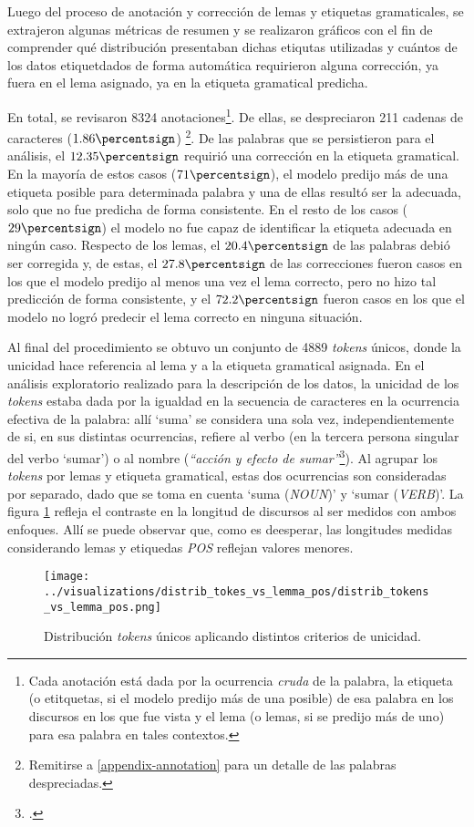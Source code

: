 Luego del proceso de anotación y corrección de lemas y etiquetas gramaticales,
se extrajeron algunas métricas de resumen y se realizaron gráficos con el fin de
comprender qué distribución presentaban dichas etiqutas utilizadas y cuántos de los
datos etiquetdados de forma automática requirieron alguna corrección, ya fuera en el
lema asignado, ya en la etiqueta gramatical predicha.
\par
En total, se revisaron 8324 anotaciones\footnote{Cada anotación está dada por
la ocurrencia \textit{cruda} de la palabra, la etiqueta (o etitquetas, si el modelo
predijo más de una posible) de esa palabra en los discursos en los que fue vista y el
lema (o lemas, si se predijo más de uno) para esa palabra en tales contextos.}.
De ellas, se despreciaron 211 cadenas de caracteres ($1.86\percentsign$)
\footnote{Remitirse a \ref{appendix-annotation} para un detalle de las palabras
despreciadas.}. De las palabras que se persistieron para el análisis,
el $12.35\percentsign$ requirió una corrección en la etiqueta gramatical.
En la mayoría de estos casos ($71\percentsign$), el modelo predijo más de una etiqueta
posible para determinada palabra y una de ellas resultó ser la adecuada, solo que no
fue predicha de forma consistente. En el resto de los casos ($29\percentsign$)
el modelo no fue capaz de identificar la etiqueta adecuada en ningún caso.
Respecto de los lemas, el $20.4\percentsign$ de las palabras debió ser corregida
y, de estas, el $27.8\percentsign$ de las correcciones fueron casos en los que el
modelo predijo al menos una vez el lema correcto, pero no hizo tal predicción de
forma consistente, y el $72.2\percentsign$ fueron casos en los que el modelo
no logró predecir el lema correcto en ninguna situación.
\par
Al final del procedimiento se obtuvo un conjunto de 4889 \textit{tokens} únicos,
donde la unicidad hace referencia al lema y a la etiqueta gramatical asignada.
En el análisis exploratorio realizado para la descripción de los datos, la unicidad
de los \textit{tokens} estaba dada por la igualdad en la secuencia de caracteres
en la ocurrencia efectiva de la palabra: allí `suma' se considera
una sola vez, independientemente de si, en sus distintas ocurrencias, refiere al
verbo (en la tercera persona singular del verbo `sumar') o al nombre
(\textit{``acción y efecto de sumar''}\footnote{.}). Al
agrupar los \textit{tokens} por lemas y etiqueta gramatical, estas dos
ocurrencias son consideradas por separado, dado que se toma en cuenta
`suma (\textit{NOUN})' y `sumar (\textit{VERB})'. La figura
\ref{fig-distrib-unique-tokens} refleja el contraste en la longitud de
discursos al ser medidos con ambos enfoques. Allí se puede observar que,
como es deesperar, las longitudes medidas considerando lemas y etiquedas
\textit{POS} reflejan valores menores.

\begin{figure}[h!]
\centering
\texttt{[image: ../visualizations/distrib\_tokes\_vs\_lemma\_pos/distrib\_tokens\_vs\_lemma\_pos.png]}
\caption{Distribución \textit{tokens} únicos aplicando distintos criterios de unicidad.}
\label{fig-distrib-unique-tokens}
\end{figure}